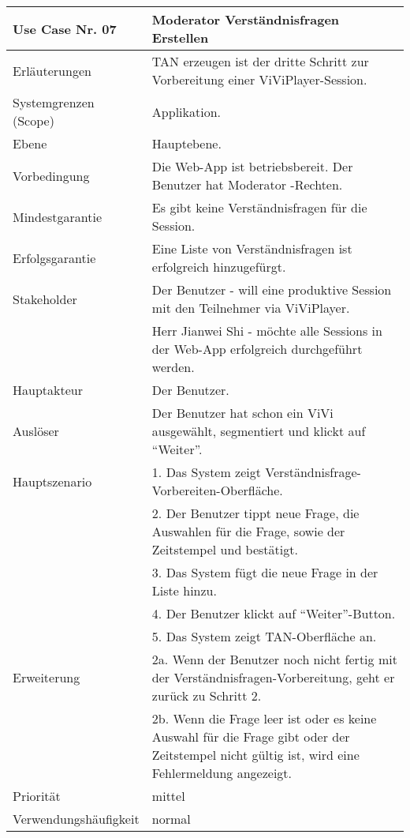 \begin{tabularx}{\linewidth}{|l|X|}
	\hline
	Use Case Nr. 07			& \textbf{Moderator Verständnisfragen Erstellen} \\ \hline
	Erläuterungen			& TAN erzeugen ist der dritte Schritt zur Vorbereitung einer 
							  ViViPlayer-Session. \\ \hline
	Systemgrenzen (Scope)	& Applikation. \\ \hline
	Ebene					& Hauptebene. \\ \hline
	Vorbedingung			& Die Web-App ist betriebsbereit. Der Benutzer hat Moderator
							  -Rechten. \\ \hline
	Mindestgarantie			& Es gibt keine Verständnisfragen für die Session.\\ \hline
	Erfolgsgarantie			& Eine Liste von Verständnisfragen ist erfolgreich hinzugefürgt.
							  \\ \hline
	Stakeholder				& Der Benutzer - will eine produktive Session mit den Teilnehmer 
							  via ViViPlayer. \\
							& Herr Jianwei Shi - möchte alle Sessions in der Web-App 
							  erfolgreich durchgeführt werden. \\ \hline
	Hauptakteur				& Der Benutzer. \\ \hline
	Auslöser				& Der Benutzer hat schon ein ViVi ausgewählt, segmentiert und 
							  klickt auf ``Weiter''. \\ \hline	
	Hauptszenario			& 1. Das System zeigt Verständnisfrage-Vorbereiten-Oberfläche. \\
							& 2. Der Benutzer tippt neue Frage, die Auswahlen für die 
							  Frage, sowie der Zeitstempel und bestätigt. \\ 
							& 3. Das System fügt die neue Frage in der Liste hinzu. \\ 
							& 4. Der Benutzer klickt auf ``Weiter''-Button. \\ 
							& 5. Das System zeigt TAN-Oberfläche an. \\ \hline
	Erweiterung				& 2a. Wenn der Benutzer noch nicht fertig mit der 
							  Verständnisfragen-Vorbereitung, geht er zurück zu Schritt 2. \\
							& 2b. Wenn die Frage leer ist oder es keine Auswahl für die 
							  Frage gibt oder der Zeitstempel nicht gültig ist, wird eine 
							  Fehlermeldung angezeigt. \\ \hline
	Priorität				& mittel \\ \hline
	Verwendungshäufigkeit	& normal \\ \hline
\end{tabularx}